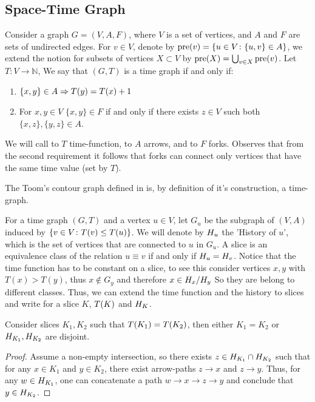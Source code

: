 

  \subsection{Space-Time Graph}
    
  \begin{definition}
    Consider a graph $G = (V, A, F)$, where $V$ is a set of vertices, and $A$ and $F$ are sets of undirected edges. For $v \in V$, denote by $\text{pre}(v) = \{ u \in V \colon \{u,v\} \in A \}$, we extend the notion for subsets of vertices $X \subset V$ by $\text{pre}(X) = \bigcup_{v \in X} \text{pre}(v)$. Let $ T \colon V \rightarrow \mathbb{N}$, We say that $(G,T)$ is a time graph if and only if:
\begin{enumerate}
  \item $\{x,y\} \in A \Rightarrow T(y) = T(x) + 1$  
  \item For $x,y \in V $  $\{x,y\} \in F $ if and only if there exists $z \in V $ such both $\{x,z\},\{y,z\} \in A$. 
\end{enumerate} We will call to $T$ time-function, to $A$ arrows, and to $F$ forks. Observes that from the second requirement it follows that forks can connect only vertices that have the same time value (set by $T$). 
  \end{definition}
  \begin{remark}
    The Toom's contour graph defined in  is, by definition of it's construction, a time-graph.
\end{remark}

  \begin{definition}
    For a time graph $(G,T)$ and a vertex $u \in V$, let $G_{u}$ be the subgraph of $(V,A)$ induced by $\{ v \in V \colon T(v) \le T(u) \}$. We will denote by $H_{u}$ the 'History of $u$', which is the set of vertices that are connected to $u$ in $G_{u}$. A slice is an equivalence class of the relation $u \equiv v$ if and only if $H_{u} = H_{v}$. Notice that the time function has to be constant on a slice, to see this consider vertices  $x,y$ with $T(x) > T(y)$, thus $x \notin G_{y}$ and therefore $x \in H_{x}/H_{y}$ So they are belong to different classes. Thus, we can extend the time function and the history to slices and write for a slice $K$, $T(K)$ and $H_{K}$.
  \end{definition}

  \begin{claim} 
    \label{claim:disj}
    Consider slices $K_{1}, K_{2}$ such that $T(K_1) = T(K_2)$, then either $K_{1}=K_{2}$ or $H_{K_1}, H_{K_2}$ are disjoint.
  \end{claim}
  \begin{proof}
Assume a non-empty intersection, so there exists $z \in H_{K_{1}}\cap H_{K_{2}}$ such that for any $x \in K_{1}$ and $y \in K_{2}$, there exist arrow-paths $z \rightarrow x$ and $z \rightarrow y$. Thus, for any $w \in H_{K_{1}}$, one can concatenate a path $w \rightarrow x \rightarrow z \rightarrow y$ and conclude that $y \in H_{K_{2}}$.
  \end{proof}

